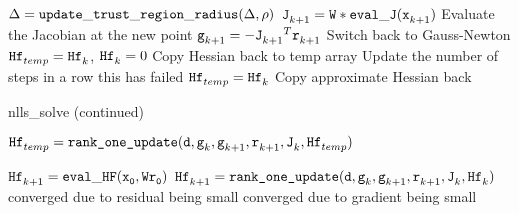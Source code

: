 \begin{algorithm}
\begin{algorithmic}[1]
        \EndIf
        \State $\Delta = {\tt update\_trust\_region\_radius}(\Delta,\rho)$
      \EndWhile
      \State $\iter[k+1]{\tJ} = {\tt W * eval\_J}(\iter[k+1]{\tx})$
      \Comment Evaluate the Jacobian at the new point
      \State $\iter[k+1]{\tg} = -{\iter[k+1]{\tJ}}^T\iter[k+1]{\tr}$
          \If { $\|\iter[k+1]{\tJ}\| > \|\iter[k]{\tJ} \| $}
          \Comment Switch back to Gauss-Newton
          \State ${\iter[temp]{\thess}} = \iter[k]{\thess}$, $\iter[k]{\thess} = 0$
          \Comment Copy Hessian back to temp array
          \EndIf
        \Else
          \Comment Update the number of steps in a row this has failed
            \State ${\iter[temp]{\thess}} = {\iter[k]{\thess}}$
            \Comment Copy approximate Hessian back
          \EndIf
          \EndIf
        \EndIf
  \end{algorithmic}
  
\end{algorithm}

\begin{algorithm}
\caption{nlls\_solve (continued)}
  \ContinuedFloat
  \begin{algorithmic}
      \State ${\iter[temp]{\thess}} = \Call{{\tt rank\_one\_update}}{\td ,\iter[k]{\tg},\iter[k+1]{\tg}, \iter[k+1]{\tr},\iter[k]{\tJ},\iter[temp]{\thess}}$
      \EndIf
    \EndIf

        \State $\iter[k+1]{\thess} = {\tt eval\_HF(\iter[0]{\tx},W\iter[0]{\tr})}$
      \Else
        \State ${\iter[k+1]{\thess}} = \Call{{\tt rank\_one\_update}}{\td ,\iter[k]{\tg},\iter[k+1]{\tg}, \iter[k+1]{\tr},\iter[k]{\tJ},\iter[k]{\thess}}$
      \EndIf
    \EndIf
    \Comment converged due to residual being small
    \Comment converged due to gradient being small
    \EndIf
    \EndFor

  \end{algorithmic}
\end{algorithm}



